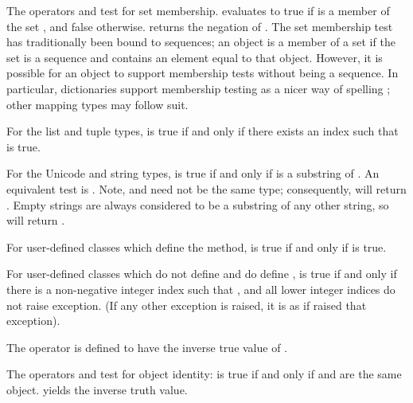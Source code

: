 The operators  and  test for set
membership.   evaluates to true if 
is a member of the set , and false otherwise.   returns the negation of .
The set membership test has traditionally been bound to sequences; an
object is a member of a set if the set is a sequence and contains an
element equal to that object.  However, it is possible for an object
to support membership tests without being a sequence.  In particular,
dictionaries support membership testing as a nicer way of spelling
; other mapping types may follow suit.

For the list and tuple types,  is true if and
only if there exists an index  such that
 is true.

For the Unicode and string types,  is true if
and only if  is a substring of .  An equivalent test is
.  Note,  and  need not be the
same type; consequently,  will return .
Empty strings are always considered to be a substring of any other string,
so  will return .

For user-defined classes which define the  method,
 is true if and only if
 is true.

For user-defined classes which do not define  and
do define ,  is true if
and only if there is a non-negative integer index  such that
, and all lower integer indices
do not raise  exception. (If any other exception
is raised, it is as if  raised that exception).

The operator  is defined to have the inverse true value
of .

The operators  and  test for object identity:
 is true if and only if  and 
are the same object.   yields the inverse
truth value.


